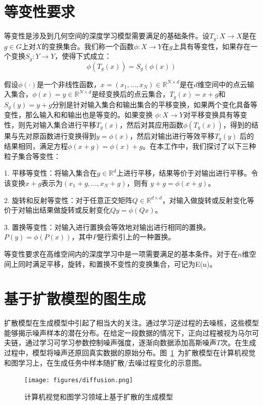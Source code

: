 \section{等变性要求}
等变性是涉及到几何空间的深度学习模型需要满足的基础条件。设$T_g: X \to X$是在$g \in G$上对$X$的变换集合。我们称一个函数$\phi: X \to Y$在$g$上具有等变性，如果存在一个变换$S_g: Y \to Y$，使得下式成立：
\begin{equation}
    \phi (T_g(x)) = S_g(\phi (x))
\end{equation}

假设$\phi (\cdot)$是一个非线性函数，$x = (x_1, ..., x_N) \in \mathbb{R}^{N \times d}$是在$d$维空间中的点云输入集合，$\phi (x) = y \in \mathbb{R}^{N \times d}$是经变换后的点云集合，$T_g (x) = x + g$和$S_g(y) = y + g$分别是针对输入集合和输出集合的平移变换，如果两个变化具备等变性，那么输入和和输出也是等变的。如果变换 $\phi : X \to Y$对平移变换具有等变性，则先对输入集合进行平移$T_g(x)$，然后对其应用函数$\phi(T_g(x))$，得到的结果与先对原函数进行变换得到$y = \phi(x)$，然后对输出进行等效平移$T_g(y)$ 后的结果相同，满足方程$\phi (x+g) = \phi (x) + g$。在本工作中，我们探讨了以下三种粒子集合等变性：

1. 平移等变性：将输入集合在$g \in \mathbb{R}^d$上进行平移，结果等价于对输出进行平移。令该变换$x + g$表示为$(x_1+g, ..., x_N + g)$，则有 $y+g = \phi (x+g)$。

2. 旋转和反射等变性：对于任意正交矩阵$Q \in \mathbb{R}^{d \times d}$，对输入做旋转或反射变化等价于对输出结果做旋转或反射变化$Qy = \phi(Qx)$。

3. 置换等变性：对输入进行置换会等效地对输出进行相同的置换。$P(y) = \phi(P(x))$，其中$P$是行索引上的一种置换。

等变性要求在高维空间内的深度学习中是一项需要满足的基本条件。对于在$n$维空间上同时满足平移，旋转，和置换不变性的变换集合，可记为E(n)。


\section{基于扩散模型的图生成}
扩散模型在生成模型中引起了相当大的关注。通过学习逆过程的去噪核，这些模型能够揭示噪声样本的潜在分布。在给定一段数据的情况下，正向过程被视为马尔可夫链，通过学习可学习参数控制噪声强度，逐渐向数据添加高斯噪声$T$次。在生成过程中，模型将噪声还原回真实数据的原始分布。图~\ref{fig:diffusion}~为扩散模型在计算机视觉和图学习上，在生成任务中样本随扩散/去噪过程变化的示意图。
\begin{figure}[h]
    \centering
    \texttt{[image: figures/diffusion.png]}
    \caption{计算机视觉和图学习领域上基于扩散的生成模型}
    \label{fig:diffusion}
\end{figure} 

